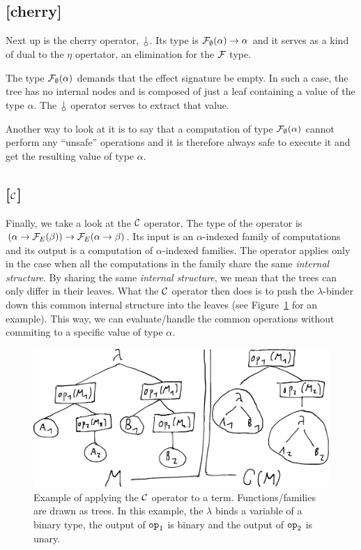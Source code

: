 \subsection*{[cherry]}

Next up is the cherry operator, $\cherry$. Its type is
$\mathcal{F}_\emptyset(\alpha) \to \alpha$ and it serves as a kind of dual to the
$\eta$ opertator, an elimination for the $\mathcal{F}$ type.

The type $\mathcal{F}_\emptyset(\alpha)$ demands that the effect signature be
empty. In such a case, the tree has no internal nodes and is composed of
just a leaf containing a value of the type $\alpha$. The $\cherry$ operator
serves to extract that value.

Another way to look at it is to say that a computation of type
$\mathcal{F}_\emptyset(\alpha)$ cannot perform any ``unsafe'' operations and it is
therefore always safe to execute it and get the resulting value of type
$\alpha$.

\subsection*{[$\mathcal{C}$]}

Finally, we take a look at the $\mathcal{C}$ operator. The type of the operator is
$(\alpha \to \mathcal{F}_E(\beta)) \to \mathcal{F}_E(\alpha \to \beta)$. Its input is an
$\alpha$-indexed family of computations and its output is a computation of
$\alpha$-indexed families. The operator applies only in the case when all
the computations in the family share the same \emph{internal structure}. By
sharing the same \emph{internal structure}, we mean that the trees can only
differ in their leaves. What the $\mathcal{C}$ operator then does is to push the
$\lambda$-binder down this common internal structure into the leaves (see
Figure~\ref{fig:c-illustration} for an example). This way, we can
evaluate/handle the common operations without commiting to a specific value
of type $\alpha$.

\begin{figure}
  \includegraphics[width=\textwidth]{doodles/c-illustration}
  \caption{\label{fig:c-illustration} Example of applying the $\mathcal{C}$
    operator to a term. Functions/families are drawn as trees. In this
    example, the $\lambda$ binds a variable of a binary type, the output of
    $\mathtt{op}_1$ is binary and the output of $\mathtt{op}_2$ is
    unary. }
\end{figure}


